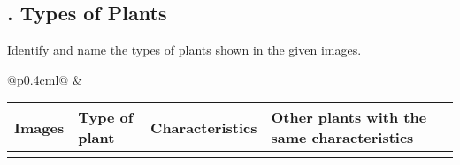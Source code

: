 \documentclass[../main.tex]{subfiles}
\begin{document}
\pagestyle{fancy}
\fancyhead{}
\fancyfoot{}
\begin{landscape}


\section*{. Types of Plants}
Identify and name the types of plants shown in the given images.\\[1cm]
\begin{tabular}{@{}p{0.4cm}l@{}}
\parbox[c][5.5cm][c]{0.4cm}{} &
  \begin{tabular}{|m{4cm}|m{4cm}|m{5cm}|m{4cm}|}
    \hline
    \textbf{Images} & \textbf{Type of plant} & \textbf{Characteristics} & \textbf{Other plants with the same characteristics} \\ \hline
    \plantrow{rose.jpg}{2.5cm}{Rose plant-}{}{}
    \plantrow{coriander.jpg}{2.5cm}{Coriander-}{}{}
    \plantrow{watermelon.jpg}{2.5cm}{Watermelon plant-}{}{}
  \end{tabular}
\end{tabular}\\[0.5cm]

\textcolor{red}{\dotfill}
\end{landscape}
\end{document}

